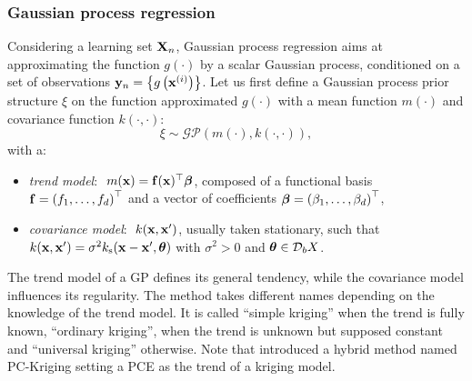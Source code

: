 \subsubsection{Gaussian process regression}

Considering a learning set ${\bf X}_n$, Gaussian process regression aims at approximating the function $g(\cdot)$ by a scalar Gaussian process, conditioned on a set of observations ${\bf y}_n = \left\{g\left({\bf x}^{(i)}\right)\right\}$. 
Let us first define a Gaussian process prior structure $\xi$ on the function approximated $g(\cdot)$ with a mean function $m(\cdot)$ and covariance function $k(\cdot, \cdot)$:  
\begin{equation}
    \xi \sim \mathcal{GP}(m(\cdot), k(\cdot, \cdot)),
\end{equation} 
with a: 
\begin{itemize}
    \item \textit{trend model}: $~m({\bf x}) = \mathbf{f}({\bf x})^\top {\boldsymbol{\beta}}$, composed of a functional basis $\mathbf{f} = \left(f_1, \dots, f_d\right)^\top$ and a vector of coefficients 
    ${\boldsymbol{\beta}} = \left(\beta_1, \dots, \beta_d\right)^\top$,
    \item \textit{covariance model}: $~k({\bf x}, {\bf x}')$, usually taken stationary, such that $k({\bf x}, {\bf x}') = \sigma^2 k_{\mathrm{s}}({\bf x} - {\bf x}', {\boldsymbol{\theta}})$ with $\sigma^2>0$ and ${\boldsymbol{\theta}} \in \mathcal{D}_bX$.
\end{itemize}
The trend model of a GP defines its general tendency, while the covariance model influences its regularity.
The method takes different names depending on the knowledge of the trend model. 
It is called ``simple kriging'' when the trend is fully known, ``ordinary kriging'', when the trend is unknown but supposed constant and ``universal kriging'' otherwise. 
Note that \cite{schobi_2015} introduced a hybrid method named PC-Kriging setting a PCE as the trend of a kriging model.   

